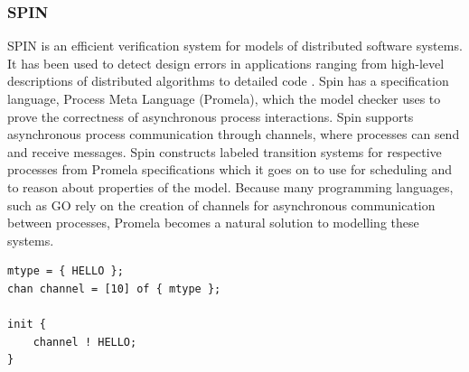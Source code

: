 \subsubsection*{\textbf{SPIN}}
SPIN is an efficient verification system for models of distributed software systems. It has been used to detect design errors in applications ranging from high-level descriptions of distributed algorithms to detailed code \cite{spin}. Spin has a specification language, Process Meta Language (Promela), which the model checker uses to prove the correctness of asynchronous process interactions. Spin supports asynchronous process communication through channels, where processes can send and receive messages. Spin constructs labeled transition systems for respective processes from Promela specifications which it goes on to use for scheduling and to reason about properties of the model. Because many programming languages, such as GO \cite{go} rely on the creation of channels for asynchronous communication between processes, Promela becomes a natural solution to modelling these systems.
\begin{lstlisting}[caption={Example of a Promela specification that enqueues a message in a channel}]
mtype = { HELLO };
chan channel = [10] of { mtype };

init {
    channel ! HELLO;
}
\end{lstlisting}
